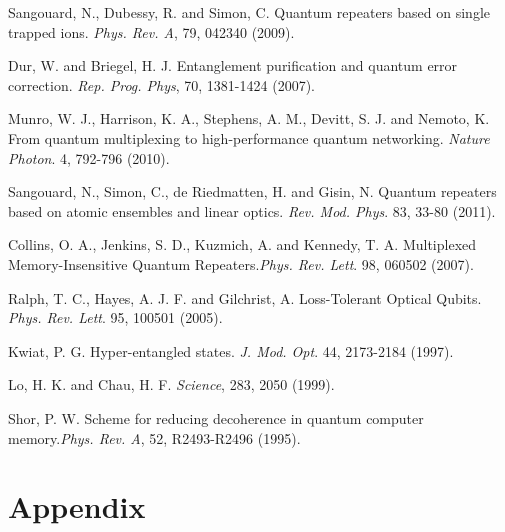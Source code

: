 \documentclass[11pt]{article}%
\begin{document}
\begin{enumerate}[ {[}1{]} ]
\item \label{ref40} Sangouard, N., Dubessy, R. and Simon, C. Quantum repeaters based on single trapped ions. \textit{Phys. Rev. A}, 79, 042340 (2009).

\item \label{ref41} Dur, W. and Briegel, H. J. Entanglement purification and quantum error correction. \textit{Rep. Prog. Phys}, 70, 1381-1424 (2007).

\item \label{ref42} Munro, W. J., Harrison, K. A., Stephens, A. M., Devitt, S. J. and Nemoto, K. From quantum multiplexing to high-performance quantum networking. \textit{Nature Photon}. 4, 792-796 (2010).

\item \label{ref43} Sangouard, N., Simon, C., de Riedmatten, H. and Gisin, N. Quantum repeaters based on atomic ensembles and linear optics. \textit{Rev. Mod. Phys}.  83, 33-80 (2011).

\item \label{ref44} Collins, O. A., Jenkins, S. D., Kuzmich, A. and Kennedy, T. A. Multiplexed Memory-Insensitive Quantum Repeaters.\textit{Phys. Rev. Lett}. 98, 060502 (2007).

\item \label{ref45} Ralph, T. C., Hayes, A. J. F. and Gilchrist, A. Loss-Tolerant Optical Qubits. \textit{Phys. Rev. Lett}. 95, 100501 (2005).

\item \label{ref46} Kwiat, P. G. Hyper-entangled states. \textit{J. Mod. Opt}. 44, 2173-2184 (1997).

\item \label{ref47} Lo, H. K. and Chau, H. F. \textit{Science}, 283, 2050 (1999).

\item \label{ref48} Shor, P. W. Scheme for reducing decoherence in quantum computer memory.\textit{Phys. Rev. A}, 52, R2493-R2496 (1995).
\end{enumerate}
\newpage

\appendix
\setcounter{table}{0}
\setcounter{figure}{0}
\setcounter{equation}{0}
\renewcommand{\thetable}{\Alph{section}.\arabic{table}}
\renewcommand{\thefigure}{\Alph{section}.\arabic{figure}}
\renewcommand{\theequation}{\Alph{section}.\arabic{equation}}

\setlength{\arrayrulewidth}{0.1mm}
\setlength{\tabcolsep}{5pt}
\renewcommand{\arraystretch}{1.5}
\section{Appendix}
\end{document}
